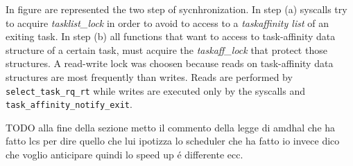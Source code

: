 In figure are represented the two step of sycnhronization. In step (a) syscalls try to acquire \textit{tasklist\_lock} in order to avoid to access to a 
\textit{taskaffinity list} of an exiting task. In step (b) all functions that want to access to task-affinity data structure of a certain task, must 
acquire the \textit{taskaff\_lock} that protect those structures. A read-write lock was choosen because reads on task-affinity data structures are 
most frequently than writes. Reads are performed by \texttt{select\_task\_rq\_rt} while writes are executed only by the syscalls and 
\texttt{task\_affinity\_notify\_exit}.


TODO  alla fine della sezione metto il commento della legge di amdhal che ha fatto lcs per dire quello che lui ipotizza lo scheduler che ha fatto
io invece dico che voglio anticipare quindi lo speed up \'e differente ecc.
